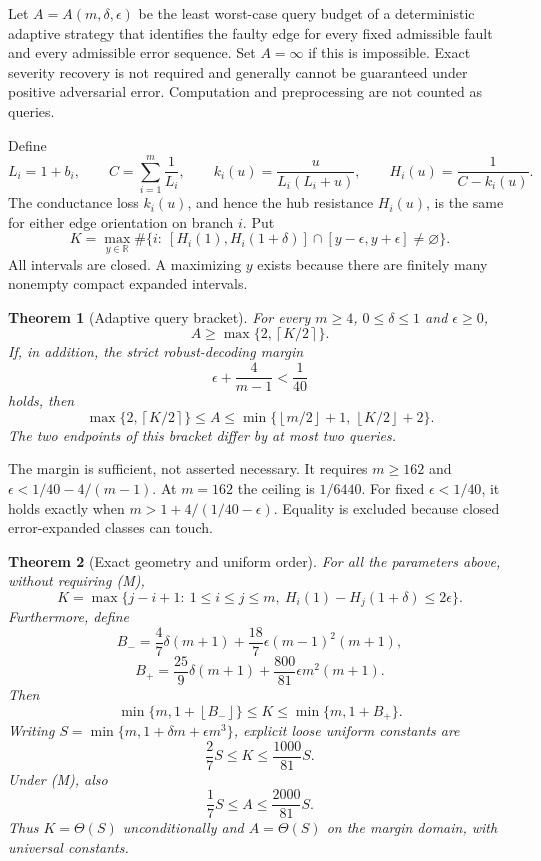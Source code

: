 \documentclass[11pt,letterpaper]{article}
\newtheorem{theorem}{Theorem}
\newcommand{\ceil}[1]{\left\lceil #1\right\rceil}
\newcommand{\floor}[1]{\left\lfloor #1\right\rfloor}
\begin{document}
Let $A=A(m,\delta,\epsilon)$ be the least worst-case query budget of a deterministic adaptive strategy that identifies the faulty edge for every fixed admissible fault and every admissible error sequence. Set $A=\infty$ if this is impossible. Exact severity recovery is not required and generally cannot be guaranteed under positive adversarial error. Computation and preprocessing are not counted as queries.

Define
\[
 L_i=1+b_i,\qquad C=\sum_{i=1}^m\frac1{L_i},\qquad
 k_i(u)=\frac{u}{L_i(L_i+u)},\qquad H_i(u)=\frac1{C-k_i(u)}.
\]
The conductance loss $k_i(u)$, and hence the hub resistance $H_i(u)$, is the same for either edge orientation on branch $i$. Put
\[
 K=\max_{y\in\mathbb R}\#\{i:\ [H_i(1),H_i(1+\delta)]\cap[y-\epsilon,y+\epsilon]\ne\varnothing\}.
\]
All intervals are closed. A maximizing $y$ exists because there are finitely many nonempty compact expanded intervals.

\begin{theorem}[Adaptive query bracket]
For every $m\ge4$, $0\le\delta\le1$ and $\epsilon\ge0$,
\[
 A\ge\max\{2,\ceil{K/2}\}.
\]
If, in addition, the strict robust-decoding margin
\[
 \epsilon+\frac4{m-1}<\frac1{40} \tag{M}
\]
holds, then
\[
 \max\{2,\ceil{K/2}\}\le A\le
 \min\{\floor{m/2}+1,\,\floor{K/2}+2\}. \tag{T}
\]
The two endpoints of this bracket differ by at most two queries.
\end{theorem}
The margin is sufficient, not asserted necessary. It requires $m\ge162$ and $\epsilon<1/40-4/(m-1)$. At $m=162$ the ceiling is $1/6440$. For fixed $\epsilon<1/40$, it holds exactly when $m>1+4/(1/40-\epsilon)$. Equality is excluded because closed error-expanded classes can touch.

\begin{theorem}[Exact geometry and uniform order]
For all the parameters above, without requiring (M),
\[
 K=\max\{j-i+1:\ 1\le i\le j\le m,\ H_i(1)-H_j(1+\delta)\le2\epsilon\}. \tag{E}
\]
Furthermore, define
\[
 B_- =\frac47\delta(m+1)+\frac{18}7\epsilon(m-1)^2(m+1),
\]
\[
 B_+ =\frac{25}9\delta(m+1)+\frac{800}{81}\epsilon m^2(m+1).
\]
Then
\[
 \min\{m,1+\floor{B_-}\}\le K\le\min\{m,1+B_+\}. \tag{G}
\]
Writing $S=\min\{m,1+\delta m+\epsilon m^3\}$, explicit loose uniform constants are
\[
 \frac27 S\le K\le\frac{1000}{81}S.
\]
Under (M), also
\[
 \frac17 S\le A\le\frac{2000}{81}S.
\]
Thus $K=\Theta(S)$ unconditionally and $A=\Theta(S)$ on the margin domain, with universal constants.
\end{theorem}
\end{document}
